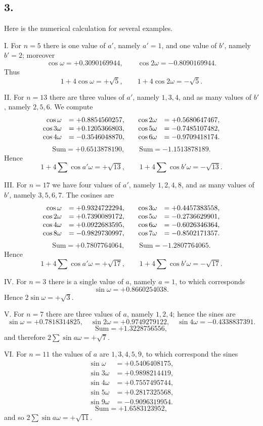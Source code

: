 \documentclass[12pt]{article}
\begin{document}
\subsection*{3.}

Here is the numerical calculation for several examples.

I. For $n=5$ there is one value of $a'$, namely $a'=1$, and one value of $b'$, namely $b'=2$; moreover
\[
\cos\omega=+0.3090169944,\qquad \cos2\omega=-0.8090169944.
\]
Thus
\[
1+4\cos\omega=+\sqrt5,\qquad 1+4\cos2\omega=-\sqrt5.
\]

II. For $n=13$ there are three values of $a'$, namely $1,3,4$, and as many values of $b'$, namely $2,5,6$. We compute
\[
\begin{array}{rl@{\qquad}rl}
\cos\omega &= +0.8854560257,& \cos2\omega &= +0.5680647467,\\
\cos3\omega &= +0.1205366803,& \cos5\omega &= -0.7485107482,\\
\cos4\omega &= -0.3546048870,& \cos6\omega &= -0.9709418174.
\end{array}
\]
\[
\text{Sum}=+0.6513878190,\qquad \text{Sum}=-1.1513878189.
\]
Hence
\[
1+4\sum\cos a'\omega=+\sqrt{13},\qquad
1+4\sum\cos b'\omega=-\sqrt{13}.
\]

III. For $n=17$ we have four values of $a'$, namely $1,2,4,8$, and as many values of $b'$, namely $3,5,6,7$. The cosines are
\[
\begin{array}{rl@{\qquad}rl}
\cos\omega &= +0.9324722294,& \cos3\omega &= +0.4457383558,\\
\cos2\omega &= +0.7390089172,& \cos5\omega &= -0.2736629901,\\
\cos4\omega &= +0.0922683595,& \cos6\omega &= -0.6026346364,\\
\cos8\omega &= -0.9829730997,& \cos7\omega &= -0.8502171357.
\end{array}
\]
\[
\text{Sum}=+0.7807764064,\qquad \text{Sum}=-1.2807764065.
\]
Hence
\[
1+4\sum\cos a'\omega=+\sqrt{17},\qquad
1+4\sum\cos b'\omega=-\sqrt{17}.
\]

IV. For $n=3$ there is a single value of $a$, namely $a=1$, to which corresponds
\[
\sin\omega=+0.8660254038.
\]
Hence $2\sin\omega=+\sqrt3$.

V. For $n=7$ there are three values of $a$, namely $1,2,4$; hence the sines are
\[
\sin\omega=+0.7818314825,\quad
\sin2\omega=+0.9749279122,\quad
\sin4\omega=-0.4338837391.
\]
\[
\text{Sum}=+1.3228756556,
\]
and therefore $2\sum\sin a\omega=+\sqrt7$.

VI. For $n=11$ the values of $a$ are $1,3,4,5,9$, to which correspond the sines
\[
\begin{array}{rl}
\sin\omega &= +0.5406408175,\\
\sin3\omega &= +0.9898214419,\\
\sin4\omega &= +0.7557495744,\\
\sin5\omega &= +0.2817325568,\\
\sin9\omega &= -0.9096319954.
\end{array}
\]
\[
\text{Sum}=+1.6583123952,
\]
and so $2\sum\sin a\omega=+\sqrt{11}$.
\end{document}

